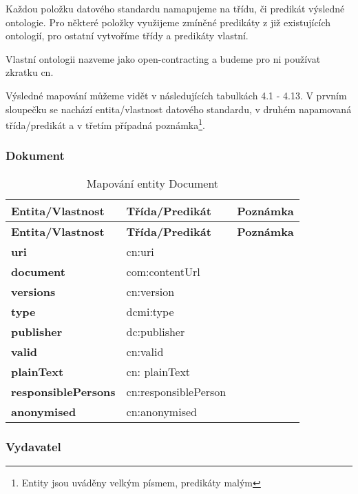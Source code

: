 Každou položku datového standardu namapujeme na třídu, či predikát výsledné ontologie. Pro některé položky využijeme zmíněné predikáty z již existujících ontologií, pro ostatní vytvoříme třídy a predikáty vlastní. 

Vlastní ontologii nazveme jako open-contracting a budeme pro ni používat zkratku cn.  

Výsledné mapování můžeme vidět v následujících tabulkách 4.1 - 4.13. V prvním sloupečku se nachází entita/vlastnost datového standardu, v druhém napamovaná třída/predikát a v třetím případná poznámka\footnote{Entity jsou uváděny velkým písmem, predikáty malým}.

\subsubsection*{Dokument}

\begin{center}
\begin{longtable}{lll}
\label{grid_mlmmh} \\
\multicolumn{1}{l}{\textbf{Entita/Vlastnost}} & 
\multicolumn{1}{l}{\textbf{Třída/Predikát}} & 
\multicolumn{1}{l}{\textbf{Poznámka}} \\ \hline 
\endfirsthead
\multicolumn{1}{l}{\textbf{Entita/Vlastnost}} & 
\multicolumn{1}{l}{\textbf{Třída/Predikát}} & 
\multicolumn{1}{l}{\textbf{Poznámka}} \\ \hline 
\hline
\endhead
\endfoot
\caption{Mapování entity Document}
\endlastfoot
\textbf{uri} & cn:uri \\
\textbf{document} & com:contentUrl \\
\textbf{versions} & cn:version \\
\textbf{type} & dcmi:type \\
\textbf{publisher} & dc:publisher \\
\textbf{valid} & cn:valid \\
\textbf{plainText} & cn: plainText \\
\textbf{responsiblePersons} & cn:responsiblePerson \\
\textbf{anonymised} & cn:anonymised \\
\end{longtable}
\end{center}

\newpage

\subsubsection*{Vydavatel}

